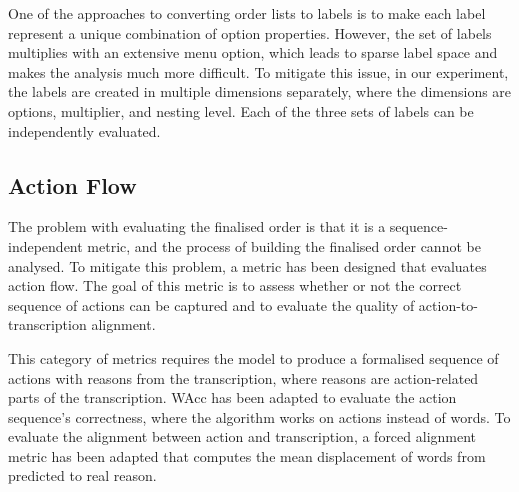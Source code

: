 One of the approaches to converting order lists to labels is to make each label represent a unique combination of option properties. However, the set of labels multiplies with an extensive menu option, which leads to sparse label space and makes the analysis much more difficult. To mitigate this issue, in our experiment, the labels are created in multiple dimensions separately, where the dimensions are options, multiplier, and nesting level. Each of the three sets of labels can be independently evaluated. %

\subsection{Action Flow}


The problem with evaluating the finalised order is that it is a sequence-independent metric, and the process of building the finalised order cannot be analysed. To mitigate this problem, a metric has been designed that evaluates action flow. The goal of this metric is to assess whether or not the correct sequence of actions can be captured and to evaluate the quality of action-to-transcription alignment. %

This category of metrics requires the model to produce a formalised sequence of actions with reasons from the transcription, where reasons are action-related parts of the transcription. WAcc has been adapted to evaluate the action sequence's correctness, where the algorithm works on actions instead of words. To evaluate the alignment between action and transcription, a forced alignment metric has been adapted that computes the mean displacement of words from predicted to real reason.
